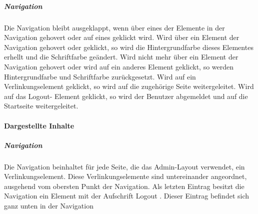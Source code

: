 \subparagraph*{Navigation}
Die Navigation bleibt ausgeklappt, wenn über eines der Elemente in der Navigation gehovert oder auf eines geklickt wird.
Wird über ein Element der Navigation gehovert oder geklickt, so wird die Hintergrundfarbe dieses Elementes erhellt und die Schriftfarbe geändert.
Wird nicht mehr über ein Element der Navigation gehovert oder wird auf ein anderes Element geklickt, so werden Hintergrundfarbe und Schriftfarbe zurückgesetzt.
Wird auf ein Verlinkungselement geklickt, so wird auf die zugehörige Seite weitergeleitet.
Wird auf das \dq Logout\dq - Element geklickt, so wird der Benutzer abgemeldet und auf die Startseite weitergeleitet.

\paragraph*{Dargestellte Inhalte}
\subparagraph*{Navigation}
Die Navigation beinhaltet für jede Seite, die das Admin-Layout verwendet, ein Verlinkungselement. 
Diese Verlinkungselemente sind untereinander angeordnet, ausgehend vom obersten Punkt der Navigation.
Als letzten Eintrag besitzt die Navigation ein Element mit der Aufschrift \dq Logout \dq. Dieser Eintrag befindet sich ganz unten in der Navigation
